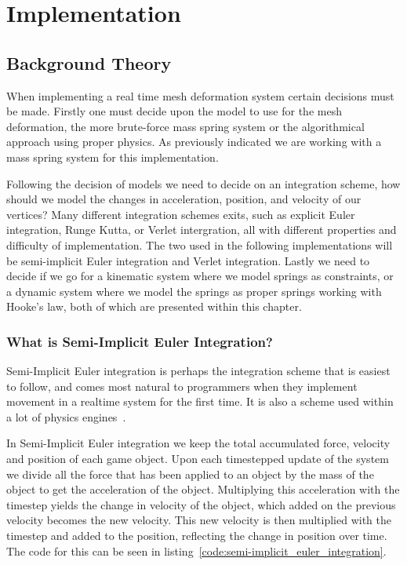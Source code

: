 \chapter{Implementation}
\section{Background Theory}
\label{chap:implementation}
When implementing a real time mesh deformation system certain decisions must be made.
Firstly one must decide upon the model to use for the mesh deformation, the more brute-force mass spring system or the algorithmical approach using proper physics.
As previously indicated we are working with a mass spring system for this implementation.

Following the decision of models we need to decide on an integration scheme, how should we model the changes in acceleration, position, and velocity of our vertices?
Many different integration schemes exits, such as explicit Euler integration, Runge Kutta, or Verlet intergration, all with different properties and difficulty of implementation.
The two used in the following implementations will be semi-implicit Euler integration and Verlet integration.
Lastly we need to decide if we go for a kinematic system where we model springs as constraints, 
or a dynamic system where we model the springs as proper springs working with Hooke's law\cite{math_for_games}, both of which are presented within this chapter.

\subsection{What is Semi-Implicit Euler Integration?}
Semi-Implicit Euler integration is perhaps the integration scheme that is easiest to follow, and comes most natural to programmers when they implement
movement in a realtime system for the first time. It is also a scheme used within a lot of physics engines~\cite{gafferongames_integration}.

In Semi-Implicit Euler integration we keep the total accumulated force, velocity and position of each game object.
Upon each timestepped update of the system we divide all the force that has been applied to an object by the mass of the object to get the acceleration of the object.
Multiplying this acceleration with the timestep yields the change in velocity of the object, which added on the previous velocity becomes the new velocity.
This new velocity is then multiplied with the timestep and added to the position, reflecting the change in position over time.
The code for this can be seen in listing~\ref{code:semi-implicit_euler_integration}.

